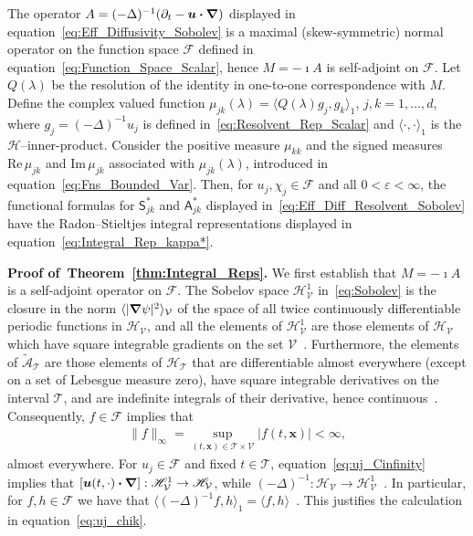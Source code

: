 \documentclass[leqno,onefignum,onetabnum]{siamltex1213}
\newcommand{\thmref}[1]{Theorem~\ref{#1}}
\newcommand\Real{\mbox{Re}\,} %
\newcommand\Imag{\mbox{Im}\,} %
\newcommand{\Tc}{\mathcal{T}}
\newcommand{\Vc}{\mathcal{V}}
\newcommand{\Sm}{\mathsf{S}}
\newcommand{\Am}{\mathsf{A}}
\newcommand{\Hs}{\mathscr{H}}
\newcommand{\As}{\mathscr{A}}
\newcommand{\Fs}{\mathscr{F}}
\newcommand\bnabla{\mbox{\boldmath${\nabla}$}}
\providecommand\bcdot{\boldsymbol{\cdot}}
\newcommand{\vecx}{\boldsymbol{x}}
\newcommand{\vecu}{\boldsymbol{u}}
\begin{document}
%
\begin{theorem}\label{thm:Integral_Reps}
  The operator $A=(-\Delta)^{-1}(\partial_t-\vecu\bcdot\bnabla)$ displayed in
  equation~\eqref{eq:Eff_Diffusivity_Sobolev} is a maximal
  (skew-symmetric) normal operator on the function space $\Fs$ defined
  in equation~\eqref{eq:Function_Space_Scalar}, hence $M=-\imath A$ is 
  self-adjoint on $\Fs$. Let $Q(\lambda)$ be the resolution of the
  identity in one-to-one correspondence with $M$. Define the complex
  valued   function $\mu_{jk}(\lambda)=\langle Q(\lambda)g_j,g_k\rangle_1$, $j,k=1,\ldots,d$, where
  $g_j=(-\Delta)^{-1}u_j$ is defined in~\eqref{eq:Resolvent_Rep_Scalar} and 
  $\langle\cdot,\cdot\rangle_1$ is the $\Hs$--inner-product. Consider the positive measure
  $\mu_{kk}$ and the signed measures $\Real\mu_{jk}$ and $\Imag\mu_{jk}$
  associated with $\mu_{jk}(\lambda)$, introduced in
  equation~\eqref{eq:Fns_Bounded_Var}.  Then, for $u_j,\chi_j\in\Fs$
  and all $0<\varepsilon<\infty$,
  the functional formulas for $\Sm^*_{jk}$ and $\Am^*_{jk}$ displayed
  in~\eqref{eq:Eff_Diff_Resolvent_Sobolev} have the 
  Radon--Stieltjes integral representations displayed in
  equation~\eqref{eq:Integral_Rep_kappa*}.   
% 
\end{theorem}
%

\textbf{Proof of~\thmref{thm:Integral_Reps}.}\hspace{1ex}
%
We first establish that $M=-\imath A$ is a self-adjoint operator on
$\Fs$. The Sobelov space $\Hs^1_{\Vc}$ in~\eqref{eq:Sobolev} is the
closure in the norm $\langle|\bnabla\psi|^2\rangle_{\Vc}$ of the space of all twice
continuously differentiable periodic functions in $\Hs_{\Vc}$, and all
the elements of $\Hs^1_{\Vc}$ are those elements of $\Hs_{\Vc}$ which
have square integrable gradients on the set
$\Vc$~\cite{Bhattacharya:AAP:1999:951}. Furthermore, the elements of
$\tilde{\As}_{\Tc}$ are those elements of $\Hs_{\Tc}$ that are
differentiable almost everywhere (except on a set of Lebesgue measure
zero), have square integrable derivatives on the interval
$\Tc$, and are indefinite integrals of their
derivative, hence continuous~\cite{Royden:1988:RA}. Consequently,
$f\in\Fs$ implies that~\cite{Stone:64,Royden:1988:RA}  
%
\begin{align}\label{eq:uj_Cinfinity}
  \|f\|_\infty=\sup_{(t,\vecx)\in\Tc\times\Vc}|f(t,\vecx)|<\infty,
\end{align}
%
almost everywhere. For $u_j\in\Fs$ and fixed $t\in\Tc$,
equation~\eqref{eq:uj_Cinfinity} implies that 
$[\vecu(t,\cdot)\bcdot\bnabla]:\Hs^1_{\Vc}\to\Hs_{\Vc}$, while
$(-\Delta)^{-1}:\Hs_{\Vc}\to\Hs^1_{\Vc}$~\cite{Bhattacharya:AAP:1999:951}. In
particular, for $f,h\in\Fs$ we have that
$\langle(-\Delta)^{-1}f,h\rangle_1=\langle f,h\rangle$~\cite{Bhattacharya:AAP:1999:951}. This 
justifies the calculation in equation~\eqref{eq:uj_chik}.  
\end{document}
